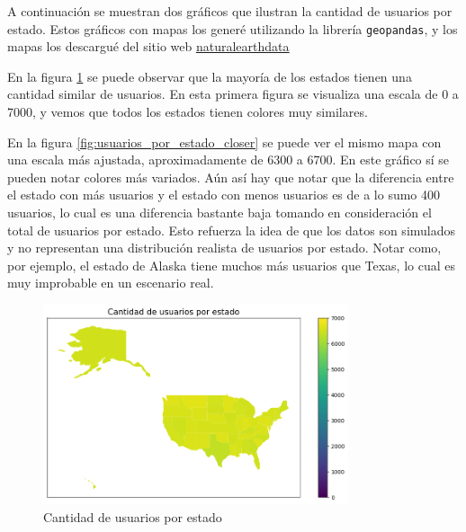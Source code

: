 A continuación se muestran dos gráficos que ilustran la cantidad de usuarios por estado. Estos gráficos con mapas los generé utilizando la librería \texttt{geopandas}, y los mapas los descargué del sitio web \href{https://www.naturalearthdata.com/downloads/110m-cultural-vectors/110m-admin-1-states-provinces/}{\underline{\textsf{naturalearthdata}}}

En la figura \ref{fig:usuarios_por_estado} se puede observar que la mayoría de los estados tienen una cantidad similar de usuarios. En esta primera figura se visualiza una escala de 0 a 7000, y vemos que todos los estados tienen colores muy similares.

En la figura \ref{fig:usuarios_por_estado_closer} se puede ver el mismo mapa con una escala más ajustada, aproximadamente de 6300 a 6700. En este gráfico sí se pueden notar colores más variados. Aún así hay que notar que la diferencia entre el estado con más usuarios y el estado con menos usuarios es de a lo sumo 400 usuarios, lo cual es una diferencia bastante baja tomando en consideración el total de usuarios por estado. Esto refuerza la idea de que los datos son simulados y no representan una distribución realista de usuarios por estado. Notar como, por ejemplo, el estado de Alaska  tiene muchos más usuarios que Texas, lo cual es muy improbable en un escenario real.

\begin{figure}[H]
    \centering
    \includegraphics[width=0.8\textwidth]{imagenes/datos_uniformes/usuarios_por_estado.png}
    \caption{Cantidad de usuarios por estado}
    \label{fig:usuarios_por_estado}
\end{figure}

